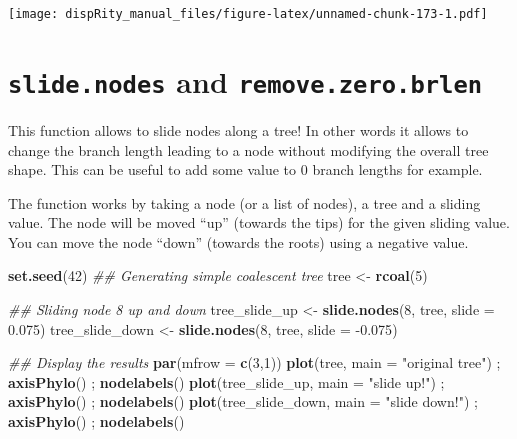 \documentclass[
]{book}
\newenvironment{Shaded}{\begin{snugshade}}{\end{snugshade}}
\newcommand{\CommentTok}[1]{\textcolor[rgb]{0.56,0.35,0.01}{\textit{#1}}}
\newcommand{\DataTypeTok}[1]{\textcolor[rgb]{0.13,0.29,0.53}{#1}}
\newcommand{\DecValTok}[1]{\textcolor[rgb]{0.00,0.00,0.81}{#1}}
\newcommand{\FloatTok}[1]{\textcolor[rgb]{0.00,0.00,0.81}{#1}}
\newcommand{\KeywordTok}[1]{\textcolor[rgb]{0.13,0.29,0.53}{\textbf{#1}}}
\newcommand{\NormalTok}[1]{#1}
\newcommand{\StringTok}[1]{\textcolor[rgb]{0.31,0.60,0.02}{#1}}
\begin{document}
\texttt{[image: dispRity\_manual\_files/figure-latex/unnamed-chunk-173-1.pdf]}

\hypertarget{slide.nodes-and-remove.zero.brlen}{%
\section{\texorpdfstring{\texttt{slide.nodes} and \texttt{remove.zero.brlen}}{slide.nodes and remove.zero.brlen}}\label{slide.nodes-and-remove.zero.brlen}}

This function allows to slide nodes along a tree!
In other words it allows to change the branch length leading to a node without modifying the overall tree shape.
This can be useful to add some value to 0 branch lengths for example.

The function works by taking a node (or a list of nodes), a tree and a sliding value.
The node will be moved ``up'' (towards the tips) for the given sliding value.
You can move the node ``down'' (towards the roots) using a negative value.

\begin{Shaded}
\begin{Highlighting}[]
\KeywordTok{set.seed}\NormalTok{(}\DecValTok{42}\NormalTok{)}
\CommentTok{\#\# Generating simple coalescent tree}
\NormalTok{tree \textless{}{-}}\StringTok{ }\KeywordTok{rcoal}\NormalTok{(}\DecValTok{5}\NormalTok{)}

\CommentTok{\#\# Sliding node 8 up and down}
\NormalTok{tree\_slide\_up \textless{}{-}}\StringTok{ }\KeywordTok{slide.nodes}\NormalTok{(}\DecValTok{8}\NormalTok{, tree, }\DataTypeTok{slide =} \FloatTok{0.075}\NormalTok{)}
\NormalTok{tree\_slide\_down \textless{}{-}}\StringTok{ }\KeywordTok{slide.nodes}\NormalTok{(}\DecValTok{8}\NormalTok{, tree, }\DataTypeTok{slide =} \FloatTok{{-}0.075}\NormalTok{)}

\CommentTok{\#\# Display the results}
\KeywordTok{par}\NormalTok{(}\DataTypeTok{mfrow =} \KeywordTok{c}\NormalTok{(}\DecValTok{3}\NormalTok{,}\DecValTok{1}\NormalTok{))}
\KeywordTok{plot}\NormalTok{(tree, }\DataTypeTok{main =} \StringTok{"original tree"}\NormalTok{) ; }\KeywordTok{axisPhylo}\NormalTok{() ; }\KeywordTok{nodelabels}\NormalTok{()}
\KeywordTok{plot}\NormalTok{(tree\_slide\_up, }\DataTypeTok{main =} \StringTok{"slide up!"}\NormalTok{) ; }\KeywordTok{axisPhylo}\NormalTok{() ; }\KeywordTok{nodelabels}\NormalTok{()}
\KeywordTok{plot}\NormalTok{(tree\_slide\_down, }\DataTypeTok{main =} \StringTok{"slide down!"}\NormalTok{) ; }\KeywordTok{axisPhylo}\NormalTok{() ; }\KeywordTok{nodelabels}\NormalTok{()}
\end{Highlighting}
\end{Shaded}
\end{document}
